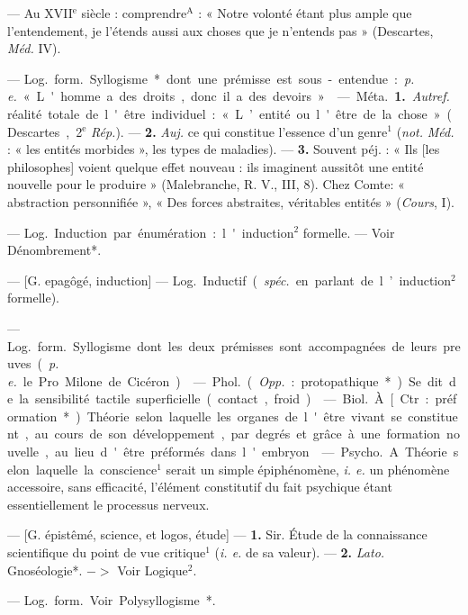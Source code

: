 \begin{itemize}[leftmargin=1cm, label=, itemsep=1pt]
 — Au XVII$^\text{e}$ siècle : comprendre$^\text{A}$ : « Notre volonté étant
plus ample que l’entendement, je
l’étends aussi aux choses que je
n'entends pas » (Descartes, \si{{\it Méd.}}
IV).

 — \si{Log.} \si{form.} Syllogisme* dont une prémisse est sous-entendue : {\it p. e.} « L'homme a des
droits, donc il a des devoirs ».

 — \si{Méta.} {\bf 1.} {\it Autref.} réalité
totale de l'être individuel : « L’entité ou l'être de la chose » (Descartes, 2$^\text{e}$ {\it Rép.}). — {\bf 2.} {\it Auj.} ce qui
constitue l’essence d’un genre$^1$ ({\it not.}
\si{{\it Méd.}} : « les entités morbides », les
types de maladies). — {\bf 3.} Souvent
péj. : « Ils [les philosophes] voient
quelque effet nouveau : ils imaginent aussitôt une entité nouvelle
pour le produire » (Malebranche,
R. V., III, 8). Chez Comte: « abstraction personnifiée », « Des forces
abstraites, véritables entités »
({\it Cours}, I).

 — \si{Log.} Induction par
énumération : l'induction$^2$ formelle.
— Voir Dénombrement*.

 — [G. epagôgé, induction]
— \si{Log.} Inductif ({\it spéc.} en parlant
de l’induction$^2$ formelle).

 — \si{Log.} \si{form.} Syllogisme dont les deux prémisses sont
accompagnées de leurs preuves ({\it p. e.}
le Pro Milone de Cicéron).

 — \si{Phol.} ({\it Opp.} : protopathique*). Se dit de la sensibilité tactile superficielle (contact, froid).

 — \si{Biol.} À [Ctr.: préformation*). Théorie selon laquelle les
organes de l'être vivant se constituent, au cours de son développement, par degrés et grâce à une
formation nouvelle, au lieu d'être
préformés dans l'embryon.

 — \si{Psycho.} A.
Théorie selon laquelle la conscience$^1$
serait un simple épiphénomène, {\it i. e.}
un phénomène accessoire, sans efficacité, l’élément constitutif du fait
psychique étant essentiellement le
processus nerveux.

 — [G. épistêmé, science,
et logos, étude] — {\bf 1.} Sir. Étude de
la connaissance scientifique du point
de vue critique$^1$ ({\it i. e.} de sa valeur).
— {\bf 2.} {\it Lato.} Gnoséologie*. $->$ Voir
Logique$^2$.

 — \si{Log.} \si{form.} Voir
Polysyllogisme*.


\end{itemize}
